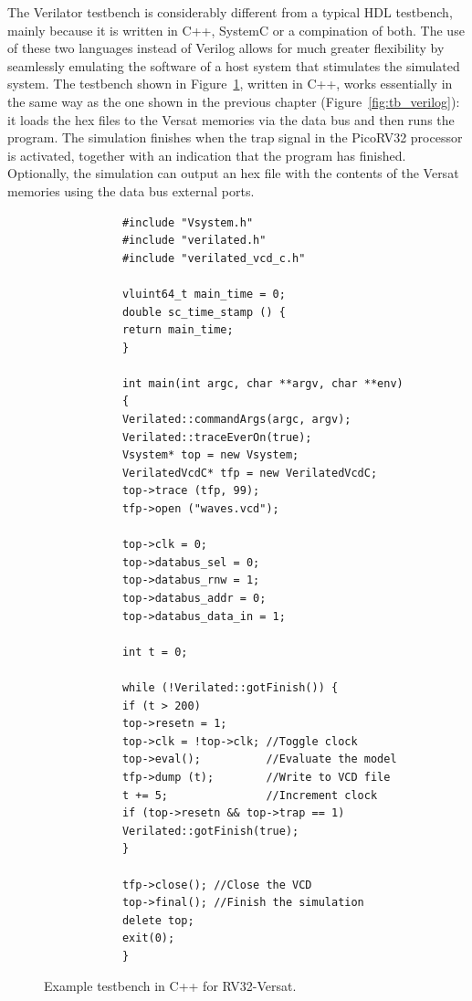 The Verilator testbench is considerably different from a typical HDL testbench,
mainly because it is written in C++, SystemC or a compination of both. The use
of these two languages instead of Verilog allows for much greater flexibility by
seamlessly emulating the software of a host system that stimulates the simulated
system. The testbench shown in Figure~\ref{fig:tb_cpp}, written in C++, works
essentially in the same way as the one shown in the previous chapter
(Figure~\ref{fig:tb_verilog}): it loads the hex files to the Versat memories via
the data bus and then runs the program. The simulation finishes when the trap
signal in the PicoRV32 processor is activated, together with an indication that
the program has finished. Optionally, the simulation can output an hex file with
the contents of the Versat memories using the data bus external ports.

\lstset{language=C++}
\begin{figure}[!htb]
	\begin{minipage}{\linewidth}
		\begin{spacing}{0.7}
			\begin{lstlisting}
			#include "Vsystem.h"
			#include "verilated.h"
			#include "verilated_vcd_c.h"
			
			vluint64_t main_time = 0; 
			double sc_time_stamp () {
			return main_time;
			}
			
			int main(int argc, char **argv, char **env)
			{
			Verilated::commandArgs(argc, argv);
			Verilated::traceEverOn(true);
			Vsystem* top = new Vsystem;
			VerilatedVcdC* tfp = new VerilatedVcdC;
			top->trace (tfp, 99);
			tfp->open ("waves.vcd");
			
			top->clk = 0;
			top->databus_sel = 0;
			top->databus_rnw = 1;
			top->databus_addr = 0;
			top->databus_data_in = 1;
			
			int t = 0;
			
			while (!Verilated::gotFinish()) {
			if (t > 200)
			top->resetn = 1;
			top->clk = !top->clk; //Toggle clock
			top->eval();          //Evaluate the model
			tfp->dump (t);        //Write to VCD file
			t += 5;               //Increment clock
			if (top->resetn && top->trap == 1)
			Verilated::gotFinish(true);
			}
			
			tfp->close(); //Close the VCD
			top->final(); //Finish the simulation
			delete top;
			exit(0);
			}
			\end{lstlisting}
		\end{spacing}
	\end{minipage}
	\vspace*{-10mm}
	\caption{Example testbench in C++ for RV32-Versat.}
	\label{fig:tb_cpp}
\end{figure}

